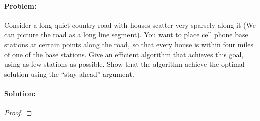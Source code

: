 \documentclass[12pt]{article}
\begin{document}
\paragraph{Problem:}
Consider a long quiet country road with houses scatter very sparsely along
it (We can picture the road as a long line segment). You want to place cell
phone base stations at certain points along the road, so that every house
is within four miles of one of the base stations.
Give an efficient algorithm that achieves this goal, using as few stations
as possible. Show that the algorithm achieve the optimal solution using
the “stay ahead” argument.
\paragraph{Solution:}
\begin{proof}

\end{proof}
\end{document}

